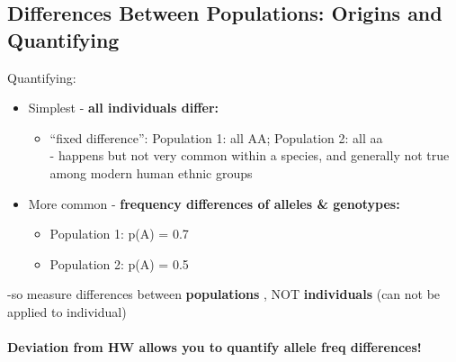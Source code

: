 \documentclass{scrartcl}
\begin{document}
\subsection{Differences Between Populations: Origins and Quantifying}
\label{sec:06-4}
Quantifying:
\begin{itemize}
\item Simplest - {\bf all individuals differ: }
  \begin{itemize}
  \item ``fixed difference'': Population 1: all AA; Population 2: all aa\\
- happens but not very common within a species, and generally not true among modern human ethnic groups
  \end{itemize}
\item More common - {\bf frequency differences of alleles \& genotypes: }
  \begin{itemize}
  \item Population 1: p(A) = 0.7
  \item Population 2: p(A) = 0.5
  \end{itemize}
\end{itemize}
-so measure differences between {\bf populations }, NOT {\bf individuals } (can not be applied to individual)

\paragraph{Deviation from HW allows you to quantify allele freq differences!}
\end{document}
